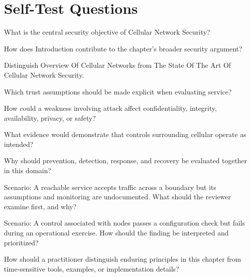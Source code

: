 \documentclass[11pt,letterpaper]{article}
\begin{document}
\section*{Self-Test Questions}
\begin{CornellRecallList}
\item What is the central security objective of Cellular Network Security?
\item How does Introduction contribute to the chapter's broader security argument?
\item Distinguish Overview Of Cellular Networks from The State Of The Art Of Cellular Network Security.
\item Which trust assumptions should be made explicit when evaluating service?
\item How could a weakness involving attack affect confidentiality, integrity, availability, privacy, or safety?
\item What evidence would demonstrate that controls surrounding cellular operate as intended?
\item Why should prevention, detection, response, and recovery be evaluated together in this domain?
\item Scenario: A reachable service accepts traffic across a boundary but its assumptions and monitoring are undocumented. What should the reviewer examine first, and why?
\item Scenario: A control associated with nodes passes a configuration check but fails during an operational exercise. How should the finding be interpreted and prioritized?
\item How should a practitioner distinguish enduring principles in this chapter from time-sensitive tools, examples, or implementation details?
\end{CornellRecallList}
\end{document}
